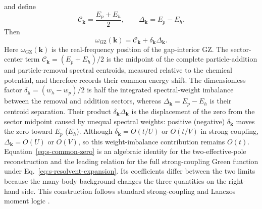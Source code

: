 \documentclass[10pt]{article}
\newcommand{\wzero}{\omega_{\mathrm{GZ}}}
\newcommand{\dk}{\delta_{\mathbf{k}}}
\newcommand{\centermom}{\mathcal C_{\mathbf{k}}}
\newcommand{\sep}{\Delta_{\mathbf{k}}}
\begin{document}
and define
\begin{equation}
\centermom=\frac{E_p+E_h}{2},\qquad \sep=E_p-E_h.
\label{eq:s-center-separation-defs}
\end{equation}
Then
\begin{equation}
\boxed{\wzero(\mathbf{k})=\centermom+\dk\sep.}
\label{eq:s-common-zero}
\end{equation}
Here $\wzero(\mathbf k)$ is the real-frequency position of the gap-interior GZ. The sector-center term $\centermom=(E_p+E_h)/2$ is the midpoint of the complete particle-addition and particle-removal spectral centroids, measured relative to the chemical potential, and therefore records their common energy shift. The dimensionless factor $\dk=(w_h-w_p)/2$ is half the integrated spectral-weight imbalance between the removal and addition sectors, whereas $\sep=E_p-E_h$ is their centroid separation. Their product $\dk\sep$ is the displacement of the zero from the sector midpoint caused by unequal spectral weights: positive (negative) $\dk$ moves the zero toward $E_p$ ($E_h$). Although $\dk=O(t/U)$ or $O(t/V)$ in strong coupling, $\sep=O(U)$ or $O(V)$, so this weight-imbalance contribution remains $O(t)$.
Equation~\ref{eq:s-common-zero} is an algebraic identity for the two-effective-pole reconstruction and the leading relation for the full strong-coupling Green function under Eq.~\ref{eq:s-resolvent-expansion}. Its coefficients differ between the two limits because the many-body background changes the three quantities on the right-hand side. This construction follows standard strong-coupling and Lanczos moment logic \cite{harris1967single,gagliano1987dynamical,pairault2000strong}.
\end{document}
